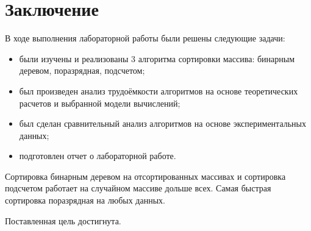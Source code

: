 \chapter*{Заключение}

В ходе выполнения лабораторной работы были решены следующие задачи:

\begin{itemize}
	\item были изучены и реализованы 3 алгоритма сортировки массива: бинарным деревом, поразрядная, подсчетом;
	
	\item был произведен анализ трудоёмкости алгоритмов на основе теоретических расчетов и выбранной модели вычислений;
	\item был сделан сравнительный анализ алгоритмов на основе экспериментальных данных;
	
	\item подготовлен отчет о лабораторной работе.
\end{itemize}

Сортировка бинарным деревом на отсортированных массивах и сортировка подсчетом работает на случайном массиве дольше всех.
Самая быстрая сортировка поразрядная на любых данных.

Поставленная цель достигнута.